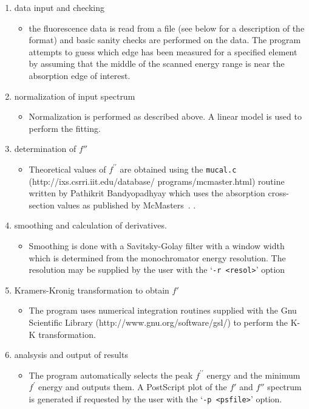 \documentclass[a4paper]{article}
\begin{document}
\begin{enumerate}
\item data input and checking
\begin{itemize}
\item the fluorescence data is read from a file (see below for a
description of the format) and basic sanity checks are performed on
the data. The program attempts to guess which edge has been measured
for a specified element by assuming that the middle of the scanned energy range
is near the absorption edge of interest.
\end{itemize}
\item normalization of input spectrum
\begin{itemize}
\item Normalization is performed as described above. A linear model is
used to perform the fitting.
\end{itemize}
\item determination of $f''$
\begin{itemize}
\item Theoretical values of $f^{\prime\prime}$ are obtained using the
{\tt mucal.c}
(http://ixs.csrri.iit.edu/database/ programs/mcmaster.html) routine
written by Pathikrit Bandyopadhyay which uses the absorption
cross-section values as published by
McMasters~\cite{mcmasters69:_compil_x}.  .
\end{itemize}
\item smoothing and calculation of derivatives.
\begin{itemize}
\item Smoothing is done with a Savitsky-Golay filter with a window width
which is determined from the monochromator energy resolution. The resolution
may be supplied by the user with the `{\tt -r <resol>}' option
\end{itemize}
\item Kramers-Kronig transformation to obtain $f'$
\begin{itemize}
\item The program uses numerical integration routines supplied with
the Gnu Scientific Library (http://www.gnu.org/software/gsl/) to
perform the K-K transformation.
\end{itemize}
\item analsysis and output of results
\begin{itemize}
\item The program automatically selects the peak $f^{\prime\prime}$
energy and the minimum $f^{\prime}$ energy and outputs them. A
PostScript plot of the $f'$ and $f''$ spectrum is generated if
requested by the user with the `{\tt -p <psfile>}' option.
\end{itemize}
\end{enumerate}
\end{document}
